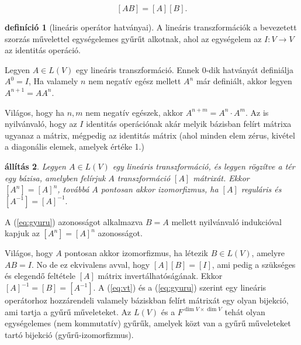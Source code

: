 \documentclass[9pt, showtrims]{memoir}
\makeatletter
\renewenvironment{proof}[1][\proofname]
    {\par\pushQED{\qed}%
    \normalfont \topsep6\p@\@plus6\p@\relax
    \trivlist
    \item[\hskip\labelsep
        \itshape
    #1\@addpunct{:}]\ignorespaces}
    {\popQED\endtrivlist\@endpefalse}
\theoremstyle{plain}
\newtheorem{proposition}{állítás}[section]
\theoremstyle{remark}
\theoremstyle{definition}
\newtheorem{definition}[proposition]{definíció}
\makeatother
\begin{document}
\begin{equation}\label{eq:gyuru}
    [AB]=[A][B].
\end{equation}
\begin{definition}[lineáris operátor hatványai]
    A lineáris transzformációk a bevezetett szorzás művelettel egységelemes gyűrűt alkotnak,
    ahol az egységelem az
    $I:V\to V$ az identitás operáció.

    Legyen $A\in L\left( V \right)$ egy lineáris transzformáció.
    Ennek $0$-dik hatványát definiálja $A^0=I$,
    Ha valamely $n$ nem negatív egész mellett $A^n$ már definiált,
    akkor legyen $A^{n+1}=AA^n$.
\end{definition}
Világos, hogy ha $n,m$ nem negatív egészek, akkor $A^{n+m}=A^n\cdot A^m$.
Az is nyilvánvaló, hogy az $I$ identitás operációnak akár melyik bázisban felírt mátrixa ugyanaz a mátrix,
mégpedig az identitás mátrix (ahol minden elem zérus, kivétel a diagonális elemek, amelyek értéke 1.)
\begin{proposition}
    Legyen $A\in L\left( V \right)$ egy lineáris transzformáció, és legyen rögzítve a tér egy bázisa,
    amelyben felírjuk $A$ transzformáció $[A]$ mátrixát.
    Ekkor 
    \(
        \left[ A^n \right]=\left[ A \right]^n
    \),
    továbbá $A$ pontosan akkor izomorfizmus, ha $[A]$ reguláris és 
    \begin{math}
        \left[ A^{-1} \right]
        =
        \left[ A \right]^{-1}.
    \end{math}
\end{proposition}
\begin{proof}
    A (\ref{eq:gyuru}) azonosságot alkalmazva $B=A$ mellett nyilvánvaló indukcióval kapjuk az
    $\left[ A^n \right]=\left[ A \right]^n$
    azonosságot.

    Világos, hogy $A$ pontosan akkor izomorfizmus, 
    ha létezik $B\in L\left( V \right)$, amelyre $AB=I$.
    No de ez ekvivalens avval, hogy $[A][B]=[I]$, ami pedig a szükséges és elegendő feltétele 
    $[A]$ mátrix invertálhatóságának.
    Ekkor $[A]^{-1}=[B]=\left[ A^{-1} \right]$.
\end{proof}
A (\ref{eq:vt}) és a (\ref{eq:gyuru}) szerint egy lineáris operátorhoz hozzárendeli valamely báziskban
felírt mátrixát egy olyan bijekció, ami tartja a gyűrű műveleteket.
Az $L\left( V \right)$ és a $F^{\dim V\times \dim V}$ tehát olyan egységelemes (nem kommutatív) gyűrűk,
amelyek közt van a gyűrű műveleteket tartó bijekció (gyűrű-izomorfizmus).
\end{document}
